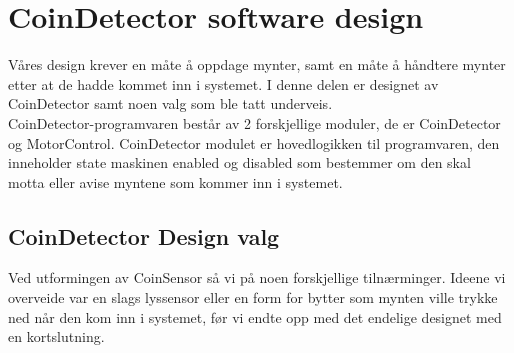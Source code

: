 \documentclass[Softwaredesign/Softwaredesign_main.tex]{subfiles}
\begin{document}
\section{CoinDetector software design}
Våres design krever en måte å oppdage mynter, samt en måte å håndtere mynter etter at de hadde kommet inn i systemet. I denne delen er designet av CoinDetector samt noen valg som ble tatt underveis. 
\\ 
CoinDetector-programvaren består av 2 forskjellige moduler, de er CoinDetector og MotorControl. CoinDetector modulet er hovedlogikken til programvaren, den inneholder state maskinen enabled og disabled som bestemmer om den skal motta eller avise myntene som kommer inn i systemet.
\subsection{CoinDetector Design valg} 
Ved utformingen av CoinSensor så vi på noen forskjellige tilnærminger. Ideene vi overveide var en slags lyssensor eller en form for bytter som mynten ville trykke ned når den kom inn i systemet, før vi endte opp med det endelige designet med en kortslutning. 
\end{document}
